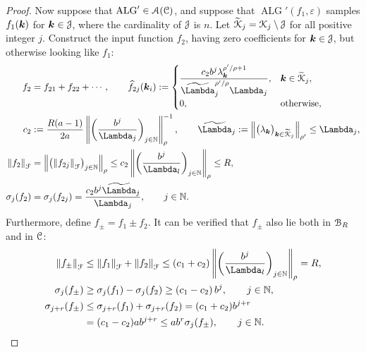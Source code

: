 \documentclass[USenglish]{article}
\theoremstyle{dgthm}
\theoremstyle{dgthm}
\theoremstyle{dgthm}
\theoremstyle{dgthm}
\theoremstyle{dgdef}
\theoremstyle{definition}
\DeclareMathOperator{\ALG}{ALG}
\newcommand{\hf}{\widehat{f}}
\newcommand{\tcalK}{\widetilde{\calK}}
\newcommand{\norm}[2][{}]{\ensuremath{\left \lVert #2 \right \rVert}_{#1}}
\newcommand{\tLambda}{\widetilde{\Lambda}}
\begin{document}
\begin{proof}
Now suppose that $\ALG' \in \calA(\calC)$, and suppose that $\ALG'(f_1,\varepsilon)$ samples $f_1({\boldsymbol{k}})$ for ${\boldsymbol{k}} \in {\mathcal{J}}$, where the cardinality of ${\mathcal{J}}$ is $n$.  Let $\tcalK_j = \calK_j \setminus \calJ$ for all positive integer $j$. Construct the input function $f_2$, having zero coefficients for ${\boldsymbol{k}} \in {\mathcal{J}}$, but otherwise looking like $f_1$:
\begin{align}
\nonumber
f_2 &= f_{21} + f_{22} +  \cdots, \qquad \hf_{2j}(\bsk_i) := \begin{cases}
\displaystyle
\frac{c_2 b^{j} \lambda_{\bsk}^{\rho'/\rho+1}}{\tLambda_j^{\rho'/\rho} \Lambda_j},  
& \bsk \in \tcalK_j,
\\
0, & \text{otherwise},
\end{cases}
\\
\nonumber
c_2 &:= \frac{R(a-1)}{2a} \norm[\rho]{ \biggl(\frac{b^{j}}{\Lambda_j} \biggr)_{j \in \N}}^{-1}, \qquad
\tLambda_j := \norm[\rho']{\bigl(\lambda_\bsk \bigr)_{\bsk \in \tcalK_j}} \le \Lambda_j, \\
\norm[\calF]{f_2} &= \norm[\rho]{\bigl( \norm[\calF]{f_{2j}} \bigr)_{j \in \N} } 
\le  c_2 \norm[\rho]{ \biggl(\frac{b^{j}}{\Lambda_l} \biggr)_{j \in \N} } \le R, \\
\sigma_j(f_2) &= \sigma_j(f_{2j}) = 
\frac{c_2 b^{j}\tLambda_j}{\Lambda_j} , \qquad j \in \N.
\end{align}
Furthermore, define $f_{\pm} = f_1 \pm f_2$.
It can be verified that $f_{\pm}$ also lie both in ${\mathcal{B}}_{R}$ and in ${\mathcal{C}}$:
\begin{align}
\nonumber
\norm[\calF]{f_\pm} &\le \norm[\calF]{f_1} + \norm[\calF]{f_2} \le (c_1 + c_2) \norm[\rho]{ \biggl(\frac{b^{j}}{\Lambda_l} \biggr)_{j \in \N} } = R,
\\
\nonumber
\sigma_j(f_\pm) & \ge \sigma_j(f_1) - \sigma_j(f_2) \ge
\left(c_1 - c_2 \right) b^{j},  \qquad j \in \N,
\\
\nonumber
\sigma_{j+r}(f_\pm) & \le \sigma_{j+r}(f_1) + \sigma_{j+r}(f_2) = 
(c_1+c_2) b^{j+r}
\\
\nonumber
& = (c_1 - c_2) a b^{j+r}
\le a b^r \sigma_j(f_\pm),  \qquad j \in \N.
\end{align}


\end{proof}
\end{document}
